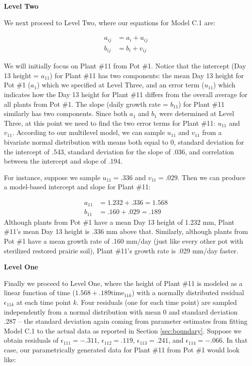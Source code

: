 \documentclass[
]{krantz}
\begin{document}
\textbf{Level Two}

We next proceed to Level Two, where our equations for Model C.1 are:

\begin{align*}
a_{ij} & = a_{i}+u_{ij} \\
b_{ij} & = b_{i}+v_{ij}
\end{align*}

We will initially focus on Plant \#11 from Pot \#1. Notice that the intercept (Day 13 height = \(a_{11}\)) for Plant \#11 has two components: the mean Day 13 height for Pot \#1 (\(a_{1}\)) which we specified at Level Three, and an error term (\(u_{11}\)) which indicates how the Day 13 height for Plant \#11 differs from the overall average for all plants from Pot \#1. The slope (daily growth rate = \(b_{11}\)) for Plant \#11 similarly has two components. Since both \(a_{1}\) and \(b_{1}\) were determined at Level Three, at this point we need to find the two error terms for Plant \#11: \(u_{11}\) and \(v_{11}\). According to our multilevel model, we can sample \(u_{11}\) and \(v_{11}\) from a bivariate normal distribution with means both equal to 0, standard deviation for the intercept of .543, standard deviation for the slope of .036, and correlation between the intercept and slope of .194.

For instance, suppose we sample \(u_{11}=.336\) and \(v_{11}=.029\). Then we can produce a model-based intercept and slope for Plant \#11:

\begin{align*}
a_{11} & = 1.232+.336 = 1.568 \\
b_{11} & = .160+.029 = .189
\end{align*}
Although plants from Pot \#1 have a mean Day 13 height of 1.232 mm, Plant \#11's mean Day 13 height is .336 mm above that. Similarly, although plants from Pot \#1 have a mean growth rate of .160 mm/day (just like every other pot with sterilized restored prairie soil), Plant \#11's growth rate is .029 mm/day faster.

\textbf{Level One}

Finally we proceed to Level One, where the height of Plant \#11 is modeled as a linear function of time (\(1.568 + .189\textrm{time}_{11k}\)) with a normally distributed residual \(\epsilon_{11k}\) at each time point \(k\). Four residuals (one for each time point) are sampled independently from a normal distribution with mean 0 and standard deviation .287 -- the standard deviation again coming from parameter estimates from fitting Model C.1 to the actual data as reported in Section \ref{sec:boundary}. Suppose we obtain residuals of \(\epsilon_{111}=-.311\), \(\epsilon_{112}=.119\), \(\epsilon_{113}=.241\), and \(\epsilon_{114}=-.066\). In that case, our parametrically generated data for Plant \#11 from Pot \#1 would look like:
\end{document}
